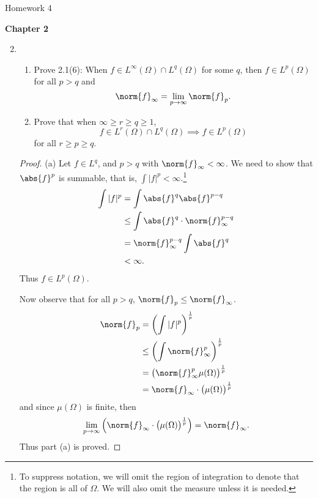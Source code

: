 \documentclass[12pt,letterpaper]{article}
\begin{document}
\pagestyle{fancy}
\begin{center}
{\Large Homework 4}%
\end{center}

\renewcommand{\B}{\bar{B}(\ell^\infty)}
\textbf{Chapter 2}

\begin{enumerate}
\setcounter{enumi}{1}
\item
	\begin{enumerate}[label=(\alph*)]
	\item Prove 2.1(6): When $f\in L^\infty(\Omega)\cap L^q(\Omega)$ for some $q$, then $f\in L^p(\Omega)$ for all $p>q$ and 
$$\norm{f}_\infty = \lim_{p\to\infty}\norm{f}_p.$$
	
	\item Prove that when $\infty\geq r\geq q\geq 1$, 
	$$f\in L^r(\Omega)\cap L^q(\Omega) \implies f \in L^p(\Omega)$$ 
	for all $r\geq p\geq q$.
	\end{enumerate} 
	
\begin{proof}(a)
Let $f\in L^q$, and $p>q$ with $\norm{f}_\infty<\infty$. We need to show that $\abs{f}^p$ is summable, that is, $\int |f|^p <\infty$.\footnote{To suppress notation, we will omit the region of integration to denote that the region is all of $\Omega$. We will also omit the measure unless it is needed.}
\begin{align*}
\int |f|^p &= \int \abs{f}^q\abs{f}^{p-q} \\
&\leq \int \abs{f}^q \cdot\norm{f}_\infty^{p-q} \\
&=\norm{f}_\infty^{p-q} \int \abs{f}^q \\
&<\infty.
\end{align*}
Thus $f\in L^p(\Omega)$. 

Now observe that for all $p>q$, $\norm{f}_p\leq\norm{f}_\infty$. 
\begin{align*}
\norm{f}_p&=\left(\int |f|^p \right)^{\frac{1}{p}} \\
&\leq\left(\int \norm{f}_\infty^p \right)^{\frac{1}{p}} \\
&=\big(\norm{f}_\infty^p \mu(\Omega) \big)^{\frac{1}{p}} \\
&=\norm{f}_\infty \cdot \big(\mu(\Omega) \big)^{\frac{1}{p}} \\
\end{align*}
and since $\mu(\Omega)$ is finite, then 
$$\lim_{p\to\infty}\left(\norm{f}_\infty \cdot \big(\mu(\Omega) \big)^{\frac{1}{p}}\right) = \norm{f}_\infty.$$
Thus part (a) is proved. \qedwhite


\end{proof}
\end{enumerate}
\end{document}
